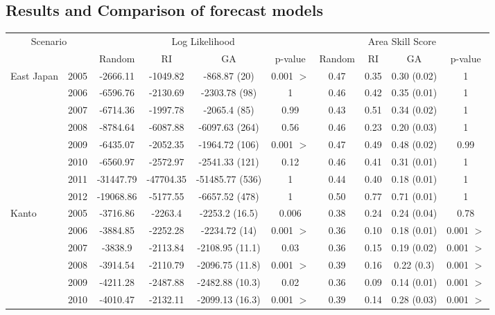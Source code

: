 \documentclass{sig-alternate}
\begin{document}
\subsection{Results and Comparison of forecast models}

\begin{table}[t]
  \begin{center}
  \begin{tabular}{|ll||c|c|c|c||c|c|c|c|}
    \hline
    \multicolumn{2}{|c|}{Scenario} & \multicolumn{4}{|c|}{Log Likelihood} & \multicolumn{4}{|c|}{Area Skill Score}\\
     & & Random & RI & GA & p-value & Random & RI & GA & p-value\\
    \hline
    East Japan & 2005 & -2666.11  &-1049.82 &-868.87 (20) & 0.001 $>$ & 0.47 & 0.35 & 0.30 (0.02) & 1 \\
    & 2006 & -6596.76 & -2130.69  &-2303.78 (98) & 1 & 0.46 & 0.42 & 0.35 (0.01) & 1 \\
    & 2007 & -6714.36 & -1997.78  &-2065.4 (85) & 0.99 & 0.43 & 0.51 & 0.34 (0.02) & 1 \\
    & 2008 &-8784.64  & -6087.88  &-6097.63 (264) & 0.56 & 0.46 & 0.23 & 0.20 (0.03) & 1 \\
    & 2009 & -6435.07 & -2052.35  &-1964.72 (106) & 0.001 $>$ & 0.47 & 0.49 & 0.48 (0.02) & 0.99\\
    & 2010 &-6560.97  & -2572.97  &-2541.33 (121) & 0.12 & 0.46 & 0.41 & 0.31 (0.01) & 1 \\
    & 2011 & -31447.79& -47704.35 &-51485.77 (536) & 1 & 0.44 & 0.40 & 0.18 (0.01) & 1 \\
    & 2012 & -19068.86& -5177.55  &-6657.52 (478) & 1 & 0.50 & 0.77 & 0.71 (0.01) & 1 \\
    \hline
    Kanto & 2005 &-3716.86 & -2263.4&-2253.2 (16.5) & 0.006 & 0.38 & 0.24 & 0.24 (0.04) & 0.78\\
    & 2006 &-3884.85 & -2252.28     &-2234.72 (14) & 0.001 $>$ & 0.36 & 0.10 & 0.18 (0.01) & 0.001 $>$\\
    & 2007 &-3838.9 & -2113.84      &-2108.95 (11.1) & 0.03 & 0.36 & 0.15 & 0.19 (0.02) &  0.001 $>$\\
    & 2008 & -3914.54&-2110.79      &-2096.75 (11.8) & 0.001 $>$ & 0.39 & 0.16 & 0.22 (0.3) & 0.001 $>$\\
    & 2009 &-4211.28 &-2487.88      &-2482.88 (10.3) & 0.02 & 0.36 & 0.09 & 0.14 (0.01) & 0.001 $>$\\
    & 2010 & -4010.47&-2132.11      &-2099.13 (16.3) & 0.001 $>$ & 0.39 & 0.14 & 0.28 (0.03) & 0.001 $>$\\

\end{tabular}
\end{center}
\end{table}
\end{document}
